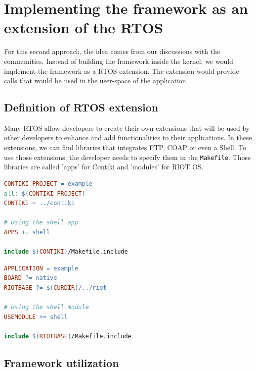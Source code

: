 \section{Implementing the framework as an extension of the RTOS \label{sec:extension}}

For this second approach, the idea comes from our discussions with the communities.
Instead of building the framework inside the kernel, we would implement the framework as a RTOS extension.
The extension would provide calls that would be used in the user-space of the application.

\subsection{Definition of RTOS extension}

Many RTOS allow developers to create their own extensions that will be used by other developers to enhance and add functionalities to their applications.
In these extensions, we can find libraries that integrates FTP, COAP or even a Shell.
To use those extensions, the developer needs to specify them in the \texttt{Makefile}.
Those libraries are called 'apps' for Contiki and 'modules' for RIOT OS.

\begin{minipage}{.45\textwidth}
\begin{lstlisting}[style=CStyle, language=make, caption=Example of Makefile using the app \texttt{shell} with Contiki]
CONTIKI_PROJECT = example
all: $(CONTIKI_PROJECT)
CONTIKI = ../contiki

# Using the shell app
APPS += shell 

include $(CONTIKI)/Makefile.include
\end{lstlisting}
\end{minipage}\hfill
\begin{minipage}{.45\textwidth}
\begin{lstlisting}[style=CStyle, language=make, caption=Example of Makefile using the module \texttt{shell} with RIOT OS]
APPLICATION = example
BOARD ?= native
RIOTBASE ?= $(CURDIR)/../riot

# Using the shell module
USEMODULE += shell 

include $(RIOTBASE)/Makefile.include
\end{lstlisting}
\end{minipage}

\subsection{Framework utilization}

